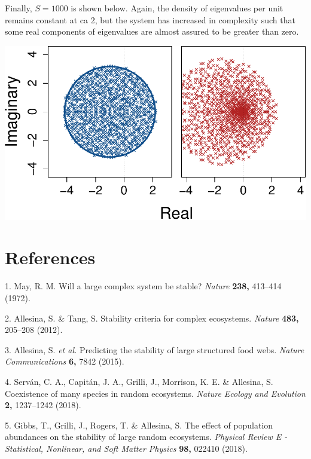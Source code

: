 \documentclass[]{article}
\begin{document}
Finally, \(S = 1000\) is shown below. Again, the density of eigenvalues
per unit remains constant at ca 2, but the system has increased in
complexity such that some real components of eigenvalues are almost
assured to be greater than zero.

\includegraphics{SI_files/figure-latex/unnamed-chunk-44-1.pdf}

\section*{References}\label{references}

\hypertarget{refs}{}
\hypertarget{ref-May1972}{}
1. May, R. M. Will a large complex system be stable? \emph{Nature}
\textbf{238,} 413--414 (1972).

\hypertarget{ref-Allesina2012}{}
2. Allesina, S. \& Tang, S. Stability criteria for complex ecosystems.
\emph{Nature} \textbf{483,} 205--208 (2012).

\hypertarget{ref-Allesina2015}{}
3. Allesina, S. \emph{et al.} Predicting the stability of large
structured food webs. \emph{Nature Communications} \textbf{6,} 7842
(2015).

\hypertarget{ref-Servan2018}{}
4. Serván, C. A., Capitán, J. A., Grilli, J., Morrison, K. E. \&
Allesina, S. Coexistence of many species in random ecosystems.
\emph{Nature Ecology and Evolution} \textbf{2,} 1237--1242 (2018).

\hypertarget{ref-Gibbs2017}{}
5. Gibbs, T., Grilli, J., Rogers, T. \& Allesina, S. The effect of
population abundances on the stability of large random ecosystems.
\emph{Physical Review E - Statistical, Nonlinear, and Soft Matter
Physics} \textbf{98,} 022410 (2018).
\end{document}
